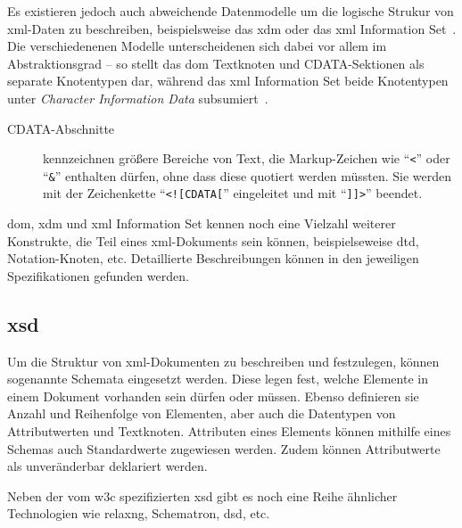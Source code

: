 Es existieren jedoch auch abweichende Datenmodelle um die logische Strukur von \acrshort{xml}-Daten zu beschreiben, beispielsweise das \acrfull{xdm} oder das \acrshort{xml} Information Set~\cite{xmlinfoset}. Die verschiedenenen Modelle unterscheidenen sich dabei vor allem im Abstraktionsgrad -- so stellt das \gls{dom} Textknoten und CDATA-Sektionen als separate Knotentypen dar, während das \acrshort{xml} Information Set beide Knotentypen unter \emph{Character Information Data} subsumiert~\cite[Abschnitt 2.6]{xmlinfoset}.

\begin{description}
    \item[CDATA-Abschnitte] kennzeichnen größere Bereiche von Text, die Markup-Zeichen wie \enquote{\texttt{<}} oder \enquote{\texttt{\&}} enthalten dürfen, ohne dass diese quotiert werden müssten. Sie werden mit der Zeichenkette \enquote{\texttt{<![CDATA[}} eingeleitet und mit \enquote{\texttt{]]>}} beendet.~\cite[Abschnitt 2.7]{maler2008xml}
\end{description}

\gls{dom}, \acrshort{xdm} und \acrshort{xml} Information Set kennen noch eine Vielzahl weiterer Konstrukte, die Teil eines \acrshort{xml}-Dokuments sein können, beispielseweise \acrfull{dtd}, Notation-Knoten, etc. Detaillierte Beschreibungen können in den jeweiligen Spezifikationen gefunden werden.~\cite{dom,xmlinfoset,xdm,maler2008xml}


\subsection{\acrfull{xsd}}
\label{sec:xsd}

Um die Struktur von \acrshort{xml}-Dokumenten zu beschreiben und festzulegen, können sogenannte Schemata eingesetzt werden. Diese legen fest, welche Elemente in einem Dokument vorhanden sein dürfen oder müssen. Ebenso definieren sie Anzahl und Reihenfolge von Elementen, aber auch die Datentypen von Attributwerten und Textknoten. Attributen eines Elements können mithilfe eines Schemas auch Standardwerte zugewiesen werden. Zudem können Attributwerte als unveränderbar deklariert werden.

Neben der vom \gls{w3c} spezifizierten \acrfull{xsd} gibt es noch eine Reihe ähnlicher Technologien wie \acrshort{relaxng}, Schematron, \gls{dsd}, etc.

